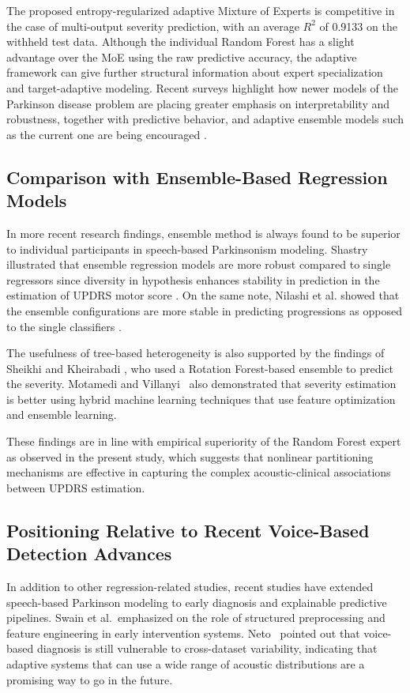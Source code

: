 \documentclass{customIEEEsingle}
\begin{document}
	The proposed entropy-regularized adaptive Mixture of Experts is competitive in the case of multi-output severity prediction, with an average $R^2$ of 0.9133 on the withheld test data. Although the individual Random Forest has a slight advantage over the MoE using the raw predictive accuracy, the adaptive framework can give further structural information about expert specialization and target-adaptive modeling. Recent surveys highlight how newer models of the Parkinson disease problem are placing greater emphasis on interpretability and robustness, together with predictive behavior, and adaptive ensemble models such as the current one are being encouraged \cite{hossain-2025}.
	
	\subsection{Comparison with Ensemble-Based Regression Models}
	
	In more recent research findings, ensemble method is always found to be superior to individual participants in speech-based Parkinsonism modeling. Shastry illustrated that ensemble regression models are more robust compared to single regressors since diversity in hypothesis enhances stability in prediction in the estimation of UPDRS motor score \cite{shastry-2023}. On the same note, Nilashi et al. showed that the ensemble configurations are more stable in predicting progressions as opposed to the single classifiers \cite{nilashi-2022}.
	
	The usefulness of tree-based heterogeneity is also supported by the findings of Sheikhi and Kheirabadi \cite{sheikhi-2022}, who used a Rotation Forest-based ensemble to predict the severity. Motamedi and Villanyi~\cite{motamedi-2025} also demonstrated that severity estimation is better using hybrid machine learning techniques that use feature optimization and ensemble learning.
	
	These findings are in line with empirical superiority of the Random Forest expert as observed in the present study, which suggests that nonlinear partitioning mechanisms are effective in capturing the complex acoustic-clinical associations between UPDRS estimation.
	
	\subsection{Positioning Relative to Recent Voice-Based Detection Advances}
	
	In addition to other regression-related studies, recent studies have extended speech-based Parkinson modeling to early diagnosis and explainable predictive pipelines. Swain et al.~\cite{swain-2024}emphasized on the role of structured preprocessing and feature engineering in early intervention systems. Neto~\cite{neto-2024} pointed out that voice-based diagnosis is still vulnerable to cross-dataset variability, indicating that adaptive systems that can use a wide range of acoustic distributions are a promising way to go in the future.
	
\end{document}
